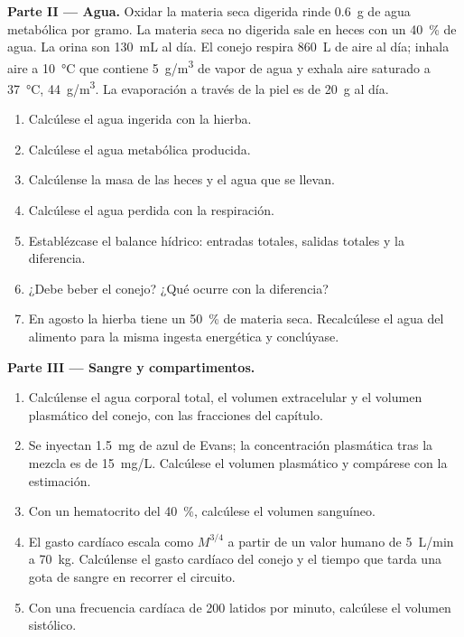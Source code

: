 \begin{problem}
\medskip
\noindent\textbf{Parte II --- Agua.}
Oxidar la materia seca digerida rinde \qty{0.6}{g} de agua metabólica por
gramo. La materia seca no digerida sale en heces con un \qty{40}{\%} de
agua. La orina son \qty{130}{mL} al día. El conejo respira \qty{860}{L} de
aire al día; inhala aire a \qty{10}{\celsius} que contiene \qty{5}{g/m^3} de
vapor de agua y exhala aire saturado a \qty{37}{\celsius},
\qty{44}{g/m^3}. La evaporación a través de la piel es de \qty{20}{g} al
día.
\begin{enumerate}[resume]
  \item Calcúlese el agua ingerida con la hierba.
  \item Calcúlese el agua metabólica producida.
  \item Calcúlense la masa de las heces y el agua que se llevan.
  \item Calcúlese el agua perdida con la respiración.
  \item Establézcase el balance hídrico: entradas totales, salidas totales
        y la diferencia.
  \item ¿Debe beber el conejo? ¿Qué ocurre con la diferencia?
  \item En agosto la hierba tiene un \qty{50}{\%} de materia seca.
        Recalcúlese el agua del alimento para la misma ingesta energética
        y conclúyase.
\end{enumerate}

\medskip
\noindent\textbf{Parte III --- Sangre y compartimentos.}
\begin{enumerate}[resume]
  \item Calcúlense el agua corporal total, el volumen extracelular y el
        volumen plasmático del conejo, con las fracciones del capítulo.
  \item Se inyectan \qty{1.5}{mg} de azul de Evans; la concentración
        plasmática tras la mezcla es de \qty{15}{mg/L}. Calcúlese el
        volumen plasmático y compárese con la estimación.
  \item Con un hematocrito del \qty{40}{\%}, calcúlese el volumen
        sanguíneo.
  \item El gasto cardíaco escala como $M^{3/4}$ a partir de un valor
        humano de \qty{5}{L/min} a \qty{70}{kg}. Calcúlense el gasto
        cardíaco del conejo y el tiempo que tarda una gota de sangre en
        recorrer el circuito.
  \item Con una frecuencia cardíaca de \qty{200}{} latidos por minuto,
        calcúlese el volumen sistólico.
\end{enumerate}


\end{problem}
